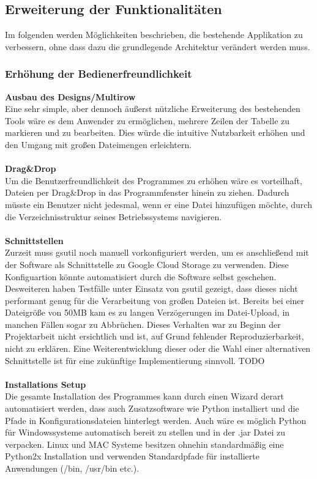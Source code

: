 \documentclass[13pt,a4paper,bibliography=totocnumbered,listof=totocnumbered]{scrartcl}
\begin{document}
\subsection{Erweiterung der Funktionalitäten}
Im folgenden werden Möglichkeiten beschrieben, die bestehende Applikation zu verbessern, ohne dass dazu die grundlegende Architektur verändert werden muss.
\subsubsection{Erhöhung der Bedienerfreundlichkeit}
\textbf{Ausbau des Designs/Multirow}\\
Eine sehr simple, aber dennoch äußerst nützliche Erweiterung des bestehenden Tools wäre es dem Anwender zu ermöglichen, mehrere Zeilen der Tabelle zu markieren und zu bearbeiten. Dies würde die intuitive Nutzbarkeit erhöhen und den Umgang mit großen Dateimengen erleichtern. \\
\\\textbf{Drag\&Drop}\\
Um die Benutzerfreundlichkeit des Programmes zu erhöhen wäre es vorteilhaft, Dateien per Drag\&Drop in das Programmfenster hinein zu ziehen. Dadurch müsste ein Benutzer nicht jedesmal, wenn er eine Datei hinzufügen möchte, durch die Verzeichnisstruktur seines Betriebssystems navigieren.\\
\\\textbf{Schnittstellen}\\
Zurzeit muss gsutil noch manuell vorkonfiguriert werden, um es anschließend mit der Software als Schnittstelle zu Google Cloud Storage zu verwenden. Diese Konfiguartion könnte automatisiert durch die Software selbst geschehen. Desweiteren haben Testfälle unter Einsatz von gsutil gezeigt, dass dieses nicht performant genug für die Verarbeitung von großen Dateien ist. Bereits bei einer Dateigröße von 50MB kam es zu langen Verzögerungen im Datei-Upload, in manchen Fällen sogar zu Abbrüchen. Dieses Verhalten war zu Beginn der Projektarbeit nicht ersichtlich und ist, auf Grund fehlender Reproduzierbarkeit, nicht zu erklären. Eine Weiterentwicklung dieser oder die Wahl einer alternativen Schnittstelle ist für eine zukünftige Implementierung sinnvoll. TODO\\
\\\textbf{Installations Setup}\\
Die gesamte Installation des Programmes kann durch einen Wizard derart automatisiert werden, dass auch Zusatzsoftware wie Python installiert und die Pfade in Konfigurationsdateien hinterlegt werden. Auch wäre es möglich Python für Windowssysteme automatisch bereit zu stellen und in der .jar Datei zu verpacken. Linux und MAC Systeme besitzen ohnehin standardmäßig eine Python2x Installation und verwenden Standardpfade für installierte Anwendungen (/bin, /usr/bin etc.).\\
\end{document}
